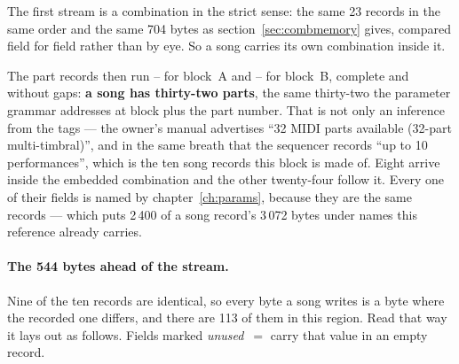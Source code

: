 The first stream is a combination in the strict sense: the same 23 records in the same
order and the same 704 bytes as section~\ref{sec:combmemory} gives, compared field for
field rather than by eye. So a song carries its own combination inside it.

The part records then run -- for block~A and --
for block~B, complete and without gaps: \textbf{a song has thirty-two parts}, the same
thirty-two the parameter grammar addresses at block  plus the part number. That
is not only an inference from the tags --- the owner's manual advertises ``32 MIDI parts
available (32-part multi-timbral)'', and in the same breath that the sequencer records
``up to 10 performances'', which is the ten song records this block is made of.
Eight arrive inside the embedded combination and the other twenty-four follow it. Every
one of their fields is named by chapter~\ref{ch:params}, because they are the same
records --- which puts 2\,400 of a song record's 3\,072 bytes under names this reference
already carries.

\paragraph{The 544 bytes ahead of the stream.} Nine of the ten records are identical, so
every byte a song writes is a byte where the recorded one differs, and there are 113 of
them in this region. Read that way it lays out as follows. Fields marked
\emph{unused}~$=$ carry that value in an empty record.

